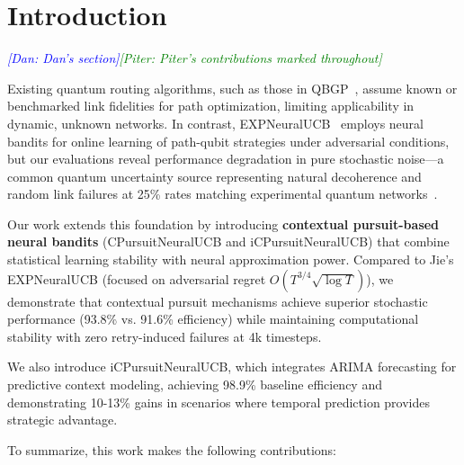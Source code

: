 \documentclass[sigconf,anonymous,review,natbib=false]{acmart}
\newcommand{\dan}[1]{\textcolor{blue}{{\it [Dan: #1]}}}
\newcommand{\piter}[1]{\textcolor{green}{{\it [Piter: #1]}}}
\begin{document}
\maketitle


\section{Introduction}
\dan{Dan's section}\piter{Piter's contributions marked throughout}

Existing quantum routing algorithms, such as those in QBGP~\cite{liu2024qbgp}, assume known or benchmarked link fidelities for path optimization, limiting applicability in dynamic, unknown networks. In contrast, EXPNeuralUCB~\cite{jie2024expneuralucb} employs neural bandits for online learning of path-qubit strategies under adversarial conditions, but our evaluations reveal performance degradation in pure stochastic noise—a common quantum uncertainty source representing natural decoherence and random link failures at 25\% rates matching experimental quantum networks~\cite{coopmans2021benchmark}.

Our work extends this foundation by introducing \textbf{contextual pursuit-based neural bandits} (CPursuitNeuralUCB and iCPursuitNeuralUCB) that combine statistical learning stability with neural approximation power. Compared to Jie's EXPNeuralUCB (focused on adversarial regret $O(T^{3/4}\sqrt{\log T})$), we demonstrate that contextual pursuit mechanisms achieve superior stochastic performance (93.8\% vs. 91.6\% efficiency) while maintaining computational stability with zero retry-induced failures at 4k timesteps.

We also introduce iCPursuitNeuralUCB, which integrates ARIMA forecasting for predictive context modeling, achieving 98.9\% baseline efficiency and demonstrating 10-13\% gains in scenarios where temporal prediction provides strategic advantage.

To summarize, this work makes the following contributions:
\end{document}
